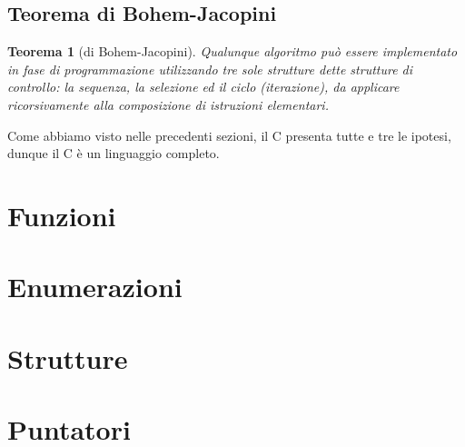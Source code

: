 \subsection{Teorema di Bohem-Jacopini}
\newtheorem*{theorem}{Teorema}
\begin{theorem}[di Bohem-Jacopini]
	Qualunque algoritmo può essere implementato in fase di programmazione utilizzando tre sole strutture dette strutture di controllo: la \textit{sequenza}, la \textit{selezione} ed il \textit{ciclo} (iterazione), da applicare ricorsivamente alla composizione di istruzioni elementari.
\end{theorem}
Come abbiamo visto nelle precedenti sezioni, il C presenta tutte e tre le ipotesi, dunque il C è un linguaggio completo.

\section{Funzioni}\label{funzioni}


\section{Enumerazioni}

\section{Strutture}

\section{Puntatori}\label{puntatori}